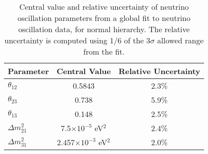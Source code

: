 
\begin{table}[!hb]
\begin{center}
\caption{Central value and relative uncertainty of neutrino oscillation 
  parameters from a global fit to neutrino oscillation data, for normal hierarchy. 
  The relative uncertainty is computed using 1/6 of the 3$\sigma$ allowed range from
  the fit.}
\label{tab:oscpar_nufit}
\begin{tabular}{l|c|c} \hline\hline
Parameter &    Central Value & Relative Uncertainty \\ \hline \hline
$\theta_{12}$ & 0.5843 & 2.3\% \\
$\theta_{23}$ & 0.738  & 5.9\% \\
$\theta_{13}$ & 0.148  & 2.5\% \\
$\Delta m^2_{21}$ & 7.5$\times10^{-5}$ eV$^2$ & 2.4\% \\
$\Delta m^2_{31}$ & 2.457$\times10^{-3}$ eV$^2$ &  2.0\% \\
\end{tabular}
\end{center}
\end{table}
%

